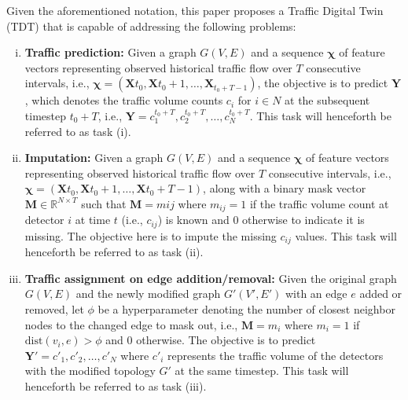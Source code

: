Given the aforementioned notation, this paper proposes a Traffic Digital Twin (TDT) that is capable of addressing the following problems:
\begin{enumerate}[(i)]
    \item \textbf{Traffic prediction:} Given a graph $G(V, E)$ and a sequence $\bm{\chi}$ of feature vectors representing observed historical traffic flow over $T$ consecutive intervals, i.e., $\bm{\chi} = (\mathbf{X}{t_0}, \mathbf{X}{t_0+1}, \ldots, \mathbf{X}_{t_0+T-1})$, the objective is to predict $\mathbf{Y}$, which denotes the traffic volume counts $c_i$ for $i \in N$ at the subsequent timestep $t_0+T$, i.e., $\mathbf{Y} = {c_1^{t_0+T}, c_2^{t_0+T}, \ldots, c_N^{t_0+T}}$. This task will henceforth be referred to as task (i).
    \item \textbf{Imputation:} Given a graph $G(V, E)$ and a sequence $\bm{\chi}$ of feature vectors representing observed historical traffic flow over $T$ consecutive intervals, i.e., $\bm{\chi} = (\mathbf{X}{t_0}, \mathbf{X}{t_0+1}, \ldots, \mathbf{X}{t_0+T-1})$, along with a binary mask vector $\mathbf{M} \in \mathbb{R}^{N \times T}$ such that $\mathbf{M} = {m{ij}}$ where $m_{ij} = 1$ if the traffic volume count at detector $i$ at time $t$ (i.e., $c_{ij}$) is known and $0$ otherwise to indicate it is missing. The objective here is to impute the missing $c_{ij}$ values. This task will henceforth be referred to as task (ii).
    \item \textbf{Traffic assignment on edge addition/removal:} Given the original graph $G(V, E)$ and the newly modified graph $G'(V', E')$ with an edge $e$ added or removed, let $\phi$ be a hyperparameter denoting the number of closest neighbor nodes to the changed edge to mask out, i.e., $\mathbf{M} = {m_i}$ where $m_i = 1$ if $\text{dist}(v_i, e) > \phi$ and 0 otherwise. The objective is to predict $\mathbf{Y'} = {c'_1, c'_2, \ldots, c'_N}$ where $c'_i$ represents the traffic volume of the detectors with the modified topology $G'$ at the same timestep. This task will henceforth be referred to as task (iii).
\end{enumerate}